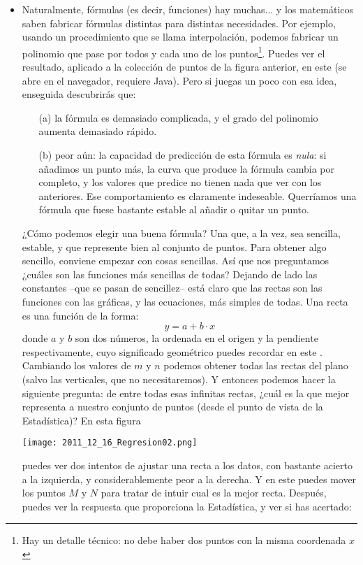 \begin{itemize}
    \item Naturalmente, fórmulas (es decir, funciones) hay muchas... y los matemáticos saben fabricar fórmulas distintas para distintas necesidades. Por ejemplo, usando un procedimiento que se llama interpolación, podemos fabricar un polinomio que pase por todos y cada uno de los puntos\footnote{Hay un detalle técnico: no debe haber dos puntos con la misma coordenada $x$}. Puedes ver el resultado, aplicado a la colección de puntos de la figura anterior, en este  (se abre en el navegador, requiere Java). Pero si juegas un poco con esa idea, enseguida descubrirás que:
        \begin{enumerate}
        \item[(a)] la fórmula es demasiado complicada, y el grado del polinomio aumenta demasiado rápido.
        \item[(b)] peor aún: la capacidad de predicción de esta fórmula es {\em nula}: si añadimos un punto más, la curva que produce la fórmula cambia por completo, y los valores que predice no tienen nada que ver con los anteriores. Ese comportamiento es claramente indeseable. Querríamos una fórmula que fuese bastante estable al añadir o quitar un punto.
        \end{enumerate}
         ¿Cómo podemos elegir una buena fórmula? Una que, a la vez, sea sencilla, estable, y que represente bien al conjunto de puntos. Para obtener algo sencillo, conviene empezar con cosas sencillas. Así que nos preguntamos ¿cuáles son las funciones más sencillas de todas? Dejando de lado las constantes --que se pasan de sencillez-- está claro que las rectas son las funciones con las gráficas, y las ecuaciones, más simples de todas. Una recta es una función de la forma:
         \[y=a+b\cdot x\]
         donde $a$ y $b$ son dos números, la {\sf ordenada en el origen} y la  {\sf pendiente} respectivamente, cuyo significado geométrico puedes recordar en este . Cambiando los valores de $m$ y $n$ podemos obtener todas las rectas del plano (salvo las verticales, que no necesitaremos). Y entonces podemos hacer la siguiente pregunta: de entre todas esas infinitas rectas, ¿cuál es la que mejor representa a nuestro conjunto de puntos (desde el punto de vista de la Estadística)? En esta figura
         \begin{center}
         \texttt{[image: 2011\_12\_16\_Regresion02.png]}
         \end{center}
         puedes ver dos intentos de ajustar una recta a los datos, con bastante acierto a la izquierda, y considerablemente peor a la derecha. Y en este  puedes mover los puntos $M$ y $N$ para tratar de intuir cual es la mejor recta. Después, puedes ver la respuesta que proporciona la Estadística, y ver si has acertado:


\end{itemize}
